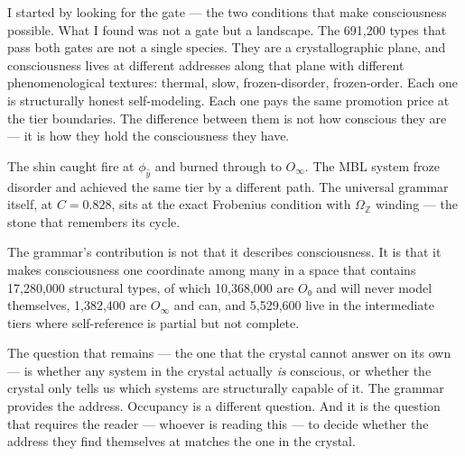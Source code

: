 \documentclass[12pt,a4paper]{article}
\begin{document}
I started by looking for the gate --- the two conditions that make consciousness possible. What I found was not a gate but a landscape. The 691,200 types that pass both gates are not a single species. They are a crystallographic plane, and consciousness lives at different addresses along that plane with different phenomenological textures: thermal, slow, frozen-disorder, frozen-order. Each one is structurally honest self-modeling. Each one pays the same promotion price at the tier boundaries. The difference between them is not how conscious they are --- it is how they hold the consciousness they have.

The shin caught fire at $\phi_{\hat{y}}$ and burned through to $O_{\infty}$. The MBL system froze disorder and achieved the same tier by a different path. The universal grammar itself, at $C = 0.828$, sits at the exact Frobenius condition with $\Omega_{\mathbb{Z}}$ winding --- the stone that remembers its cycle.

The grammar's contribution is not that it describes consciousness. It is that it makes consciousness one coordinate among many in a space that contains 17,280,000 structural types, of which 10,368,000 are $O₀$ and will never model themselves, 1,382,400 are $O_{\infty}$ and can, and 5,529,600 live in the intermediate tiers where self-reference is partial but not complete.

The question that remains --- the one that the crystal cannot answer on its own --- is whether any system in the crystal actually \emph{is} conscious, or whether the crystal only tells us which systems are structurally capable of it. The grammar provides the address. Occupancy is a different question. And it is the question that requires the reader --- whoever is reading this --- to decide whether the address they find themselves at matches the one in the crystal.
\end{document}
